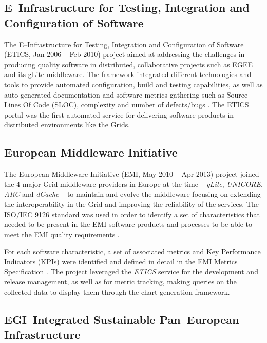 \documentclass[journal]{IEEEtran}
\begin{document}
\subsection{E--Infrastructure for Testing, Integration and Configuration of Software}

The E--Infrastructure for Testing, Integration and Configuration of Software
\cite{cordis:etics, cordis:etics2} (ETICS, Jan 2006 -- Feb 2010) project aimed
at addressing the challenges in producing quality software in distributed,
collaborative projects such as EGEE and its gLite middleware. The framework
integrated different technologies and tools to provide automated configuration,
build and testing capabilities, as well as auto-generated documentation and
software metrics gathering such as Source Lines Of Code (SLOC), complexity and
number of defects/bugs \cite{etics}. The ETICS portal was the first automated
service for delivering software products in distributed environments like
the Grids.

\subsection{European Middleware Initiative}

The European Middleware Initiative (EMI, May 2010 -- Apr 2013)
\cite{cordis:emi} project joined the 4 major Grid middleware providers in
Europe at the time -- {\sl gLite}, {\sl UNICORE}, {\sl ARC} and {\sl dCache} --
to maintain and evolve the middleware focusing on extending the
interoperability in the Grid and improving the reliability of the services. The
ISO/IEC 9126 \cite{iso-9126} standard was used in order to identify a set of
characteristics that needed to be present in the EMI software products and
processes to be able to meet the EMI quality requirements
\cite{emi-quality-model}.

For each software characteristic, a set of associated
metrics and Key Performance Indicators (KPIs) were identified and defined in
detail in the EMI Metrics Specification \cite{emi-metrics}. The project
leveraged the {\sl ETICS} service for the development and release management,
as well as for metric tracking, making queries on the collected data to display
them through the chart generation framework.

\subsection{EGI--Integrated Sustainable Pan--European Infrastructure}
\end{document}
